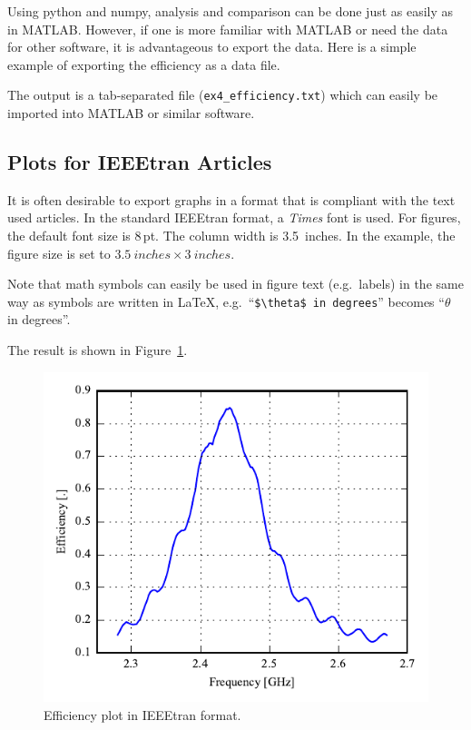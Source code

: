 \documentclass[10pt]{article}
\begin{document}
Using python and numpy, analysis and comparison can be done just as easily as in MATLAB. However, if one is more familiar with MATLAB or need the data for other software, it is advantageous to export the data. Here is a simple example of exporting the efficiency as a data file.

The output is a tab-separated file (\texttt{ex4\_efficiency.txt}) which can easily be imported into MATLAB or similar software.


\clearpage
\subsection{Plots for IEEEtran Articles}
It is often desirable to export graphs in a format that is compliant with the text used articles. In the standard IEEEtran format, a \emph{Times} font is used. For figures, the default font size is 8\,pt. The column width is \SI{3.5}{inches}. In the example, the figure size is set to $\SI{3.5}{inches}\times \SI{3}{inches}$.

Note that math symbols can easily be used in figure text (e.g.\ labels) in the same way as symbols are written in \LaTeX, e.g.\ ``\verb|$\theta$ in degrees|'' becomes ``$\theta$ in degrees''.

The result is shown in Figure~\ref{fig:example5}.


\begin{figure}[htbp]
    \centering
    \includegraphics{examples/ex5_efficiency.pdf}
    \caption{Efficiency plot in IEEEtran format.}
    \label{fig:example5}
\end{figure}
\end{document}
